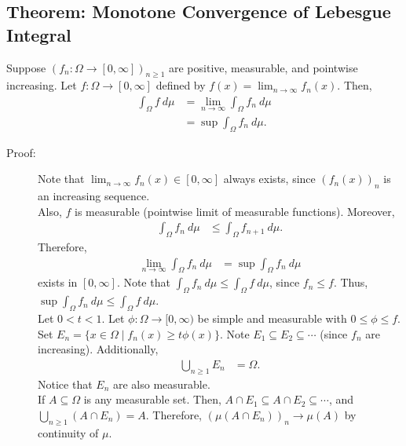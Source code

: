 \documentclass[9pt]{extarticle}
\begin{document}
  \subsection{Theorem: Monotone Convergence of Lebesgue Integral}%
  Suppose $\left(f_n: \Omega \rightarrow [0,\infty]\right)_{n\geq 1}$ are positive, measurable, and pointwise increasing. Let $f: \Omega \rightarrow [0,\infty]$ defined by $f(x) = \lim_{n\rightarrow \infty}f_n(x)$. Then,
  \begin{align*}
    \int_{\Omega}f~d\mu &= \lim_{n\rightarrow\infty}\int_{\Omega}f_{n}~d\mu\\
                        &= \sup \int_{\Omega}f_n~d\mu.
  \end{align*}
  \begin{description}
    \item[Proof:] Note that $\lim_{n\rightarrow \infty}f_n(x) \in [0,\infty]$ always exists, since $\left(f_n(x)\right)_n$ is an increasing sequence.\\

      Also, $f$ is measurable (pointwise limit of measurable functions). Moreover,
      \begin{align*}
        \int_{\Omega}f_n~d\mu &\leq \int_{\Omega}f_{n+1}~d\mu.
      \end{align*}
      Therefore,
      \begin{align*}
        \lim_{n\rightarrow\infty}\int_{\Omega}f_n~d\mu &= \sup\int_{\Omega}f_n~d\mu
      \end{align*}
      exists in $[0,\infty]$. Note that $\int_{\Omega}f_n~d\mu \leq \int_{\Omega}f~d\mu$, since $f_n\leq f$. Thus, $\sup\int_{\Omega}f_n~d\mu \leq \int_{\Omega}f~d\mu$.\\

     Let $0 < t < 1$. Let $\phi: \Omega \rightarrow [0,\infty)$ be simple and measurable with $0\leq \phi \leq f$.\\

      Set $E_n = \{x\in\Omega\mid f_n(x) \geq t\phi(x)\}$. Note $E_1\subseteq E_2\subseteq \cdots$ (since $f_n$ are increasing). Additionally,
      \begin{align*}
        \bigcup_{n\geq 1}E_n &= \Omega.
      \end{align*}
      Notice that $E_n$ are also measurable.\\

      If $A\subseteq \Omega$ is any measurable set. Then, $A\cap E_1\subseteq A\cap E_2 \subseteq \cdots$, and $\bigcup_{n\geq 1}(A\cap E_n) = A$. Therefore, $\left(\mu(A\cap E_n)\right)_n \rightarrow \mu(A)$ by continuity of $\mu$.\\


\end{description}
\end{document}
